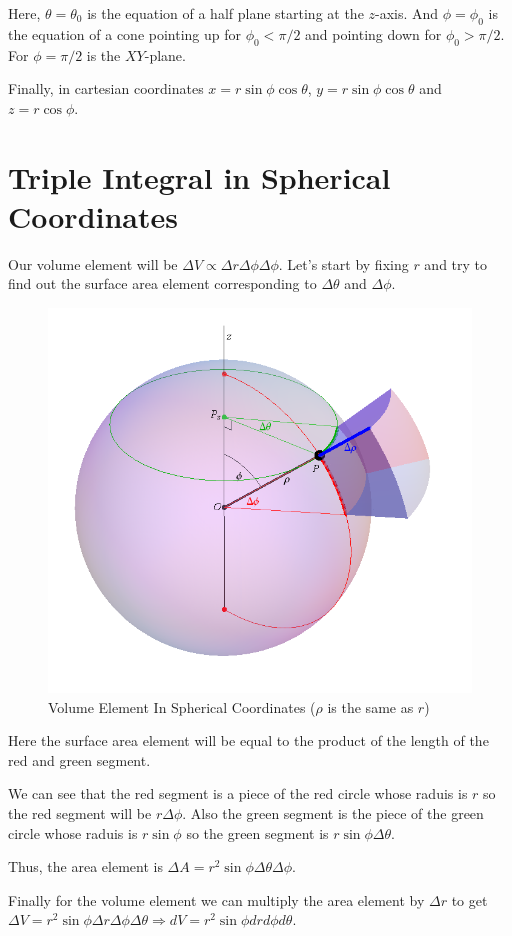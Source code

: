Here, $\theta = \theta_0$ is the equation of a half plane starting at the $z$-axis.
And $\phi = \phi_0$ is the equation of a cone pointing up for $\phi_0 < \pi / 2$ and pointing down for $\phi_0 > \pi / 2$.
For $\phi = \pi/2$ is the $XY$-plane.

Finally, in cartesian coordinates $x = r \sin \phi \cos \theta$, $y = r \sin \phi \cos \theta$ and $z = r \cos \phi$.

\pagebreak

\section{Triple Integral in Spherical Coordinates}

Our volume element will be $\Delta V \propto \Delta r \Delta \phi \Delta \phi$. 
Let's start by fixing $r$ and try to find out the surface area element corresponding to $\Delta \theta$ and $\Delta \phi$.

\begin{figure}[ht!]
    \centering
    \includegraphics[scale=0.3]{./images/lecture_22_figure_2.png}
    \caption{Volume Element In Spherical Coordinates ($\rho$ is the same as $r$)}
\end{figure}

Here the surface area element will be equal to the product of the length of the red and green segment.

We can see that the red segment is a piece of the red circle whose raduis is $r$ so the red segment will be $r \Delta \phi$.
Also the green segment is the piece of the green circle whose raduis is $r \sin \phi$ so the green segment is $r \sin \phi \Delta \theta$.

Thus, the area element is $\Delta A = r^2 \sin \phi \Delta \theta \Delta \phi$.

Finally for the volume element we can multiply the area element by $\Delta r$ to get $\Delta V = r^2 \sin \phi \Delta r \Delta \phi \Delta \theta \Rightarrow dV = r^2 \sin \phi dr d\phi d\theta$.


